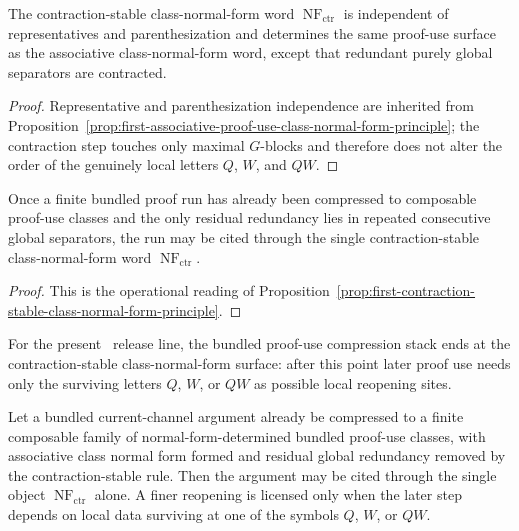 \begin{proposition}
\label{prop:first-contraction-stable-class-normal-form-principle}
The contraction-stable class-normal-form word $\operatorname{NF}_{\mathrm{ctr}}$ is independent of representatives and parenthesization and determines the same proof-use surface as the associative class-normal-form word, except that redundant purely global separators are contracted.
\end{proposition}

\begin{proof}
Representative and parenthesization independence are inherited from Proposition~\ref{prop:first-associative-proof-use-class-normal-form-principle}; the contraction step touches only maximal $G$-blocks and therefore does not alter the order of the genuinely local letters $Q$, $W$, and $QW$.
\end{proof}

\begin{corollary}
\label{cor:use-rule-for-the-first-contraction-stable-class-normal-form-principle}
Once a finite bundled proof run has already been compressed to composable proof-use classes and the only residual redundancy lies in repeated consecutive global separators, the run may be cited through the single contraction-stable class-normal-form word $\operatorname{NF}_{\mathrm{ctr}}$.
\end{corollary}

\begin{proof}
This is the operational reading of Proposition~\ref{prop:first-contraction-stable-class-normal-form-principle}.
\end{proof}

\begin{remark}
\label{rem:status-of-the-terminal-proof-use-surface-in-the-present-v319-line}
For the present \docversion\ release line, the bundled proof-use compression stack ends at the contraction-stable class-normal-form surface: after this point later proof use needs only the surviving letters $Q$, $W$, or $QW$ as possible local reopening sites.
\end{remark}

\begin{proposition}
\label{prop:terminal-citation-rule-for-the-present-v319-compression-line}
Let a bundled current-channel argument already be compressed to a finite composable family of normal-form-determined bundled proof-use classes, with associative class normal form formed and residual global redundancy removed by the contraction-stable rule. Then the argument may be cited through the single object $\operatorname{NF}_{\mathrm{ctr}}$ alone. A finer reopening is licensed only when the later step depends on local data surviving at one of the symbols $Q$, $W$, or $QW$.
\end{proposition}

